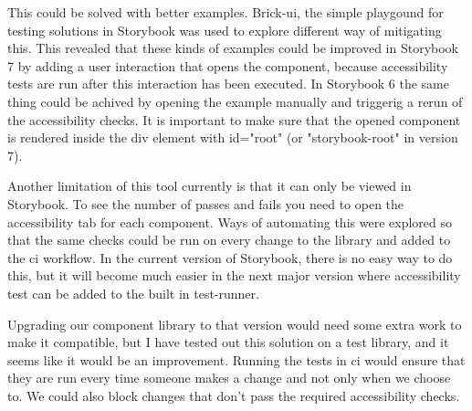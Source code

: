 \documentclass{master_thesis}
\begin{document}
This could be solved with better examples. Brick-ui, the simple playgound for testing solutions in Storybook was used to explore different way of mitigating this. This revealed that these kinds of examples could be improved in Storybook 7 by adding a user interaction that opens the component, because accessibility tests are run after this interaction has been executed. In Storybook 6 the same thing could be achived by opening the example manually and triggerig a rerun of the accessibility checks. It is important to make sure that the opened component is rendered inside the div element with id="root" (or "storybook-root" in version 7).

Another limitation of this tool currently is that it can only be viewed in Storybook. To see the number of passes and fails you need to open the accessibility tab for each component. Ways of automating this were explored so that the same checks could be run on every change to the library and added to the \ac{ci} workflow. In the current version of Storybook, there is no easy way to do this, but it will become much easier in the next major version where accessibility test can be added to the built in test-runner.

Upgrading our component library to that version would need some extra work to make it compatible, but I have tested out this solution on a test library, and it seems like it would be an improvement. Running the tests in \ac{ci} would ensure that they are run every time someone makes a change and not only when we choose to. We could also block changes that don't pass the required accessibility checks.


\end{document}
